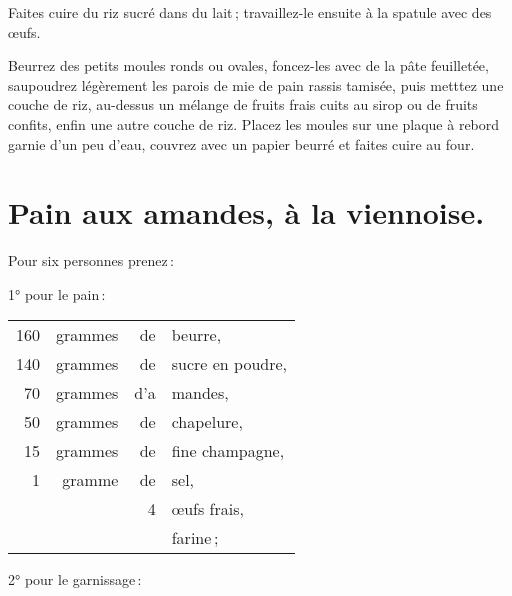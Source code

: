 Faites cuire du riz sucré dans du lait ; travaillez-le ensuite à la spatule avec
des œufs.

Beurrez des petits moules ronds ou ovales, foncez-les avec de la pâte
feuilletée, saupoudrez légèrement les parois de mie de pain rassis tamisée,
puis metttez une couche de riz, au-dessus un mélange de fruits frais cuits au
sirop ou de fruits confits, enfin une autre couche de riz. Placez les moules
sur une plaque à rebord garnie d'un peu d’eau, couvrez avec un papier beurré et
faites cuire au four.

\section*{\centering Pain aux amandes, à la viennoise.}
{}

Pour six personnes prenez :

\medskip

1° pour le pain :

\footnotesize
\begin{longtable}{rrrp{16em}}
    160 & grammes & de & beurre,                                                                          \\
    140 & grammes & de & sucre en poudre,                                                                 \\
     70 & grammes & d'a& mandes,                                                                          \\
     50 & grammes & de & chapelure,                                                                       \\
     15 & grammes & de & fine champagne,                                                                  \\
      1 & gramme  & de & sel,                                                                             \\
        &         &  4 & œufs frais,                                                                      \\
        &         &    & farine ;                                                                         \\
\end{longtable}
\normalsize

2° pour le garnissage :

